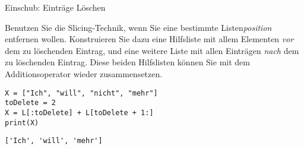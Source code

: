 
\begin{frame}[fragile]{Einschub: Einträge Löschen}
%
\begin{hintbox}
Benutzen Sie die Slicing-Technik, wenn Sie eine bestimmte Listen\emph{position} entfernen wollen. Konstruieren Sie dazu eine Hilfsliste mit allem Elementen \emph{vor} dem zu löschenden Eintrag, und eine weitere Liste mit allen Einträgen \emph{nach} dem zu löschenden Eintrag. Diese beiden Hilfslisten können Sie mit dem Additionsoperator wieder zusammensetzen.
\end{hintbox}
%
\begin{tcbraster}[raster columns=2,
                  raster equal height,
                  nobeforeafter,
                  raster column skip=0.5cm]
\begin{codebox}
\begin{verbatim}
X = ["Ich", "will", "nicht", "mehr"]
toDelete = 2
X = L[:toDelete] + L[toDelete + 1:]
print(X)
\end{verbatim}
\end{codebox}
%
\begin{cmdbox}[Ausgabe]
\begin{verbatim}
['Ich', 'will', 'mehr']
\end{verbatim}
\end{cmdbox}
\end{tcbraster}
%
\end{frame}


